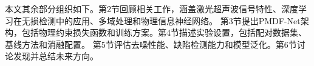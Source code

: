 本文其余部分组织如下。第2节回顾相关工作，涵盖激光超声波信号特性、深度学习在无损检测中的应用、多域处理和物理信息神经网络。
第3节提出PMDF-Net架构，包括物理约束损失函数和训练方案。第4节描述实验设置，包括配对数据集、基线方法和消融配置。
第5节评估去噪性能、缺陷检测能力和模型泛化。第6节讨论发现并总结未来方向。
